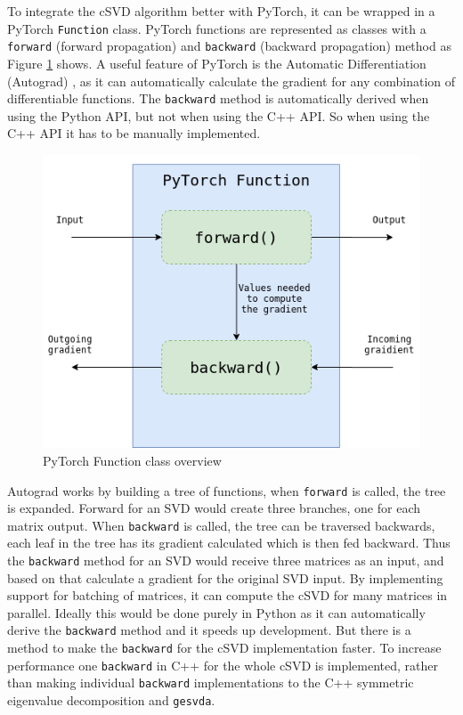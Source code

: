 To integrate the cSVD algorithm better with PyTorch, it can be wrapped in a PyTorch \texttt{Function} class. PyTorch functions are represented as classes with a \texttt{forward} (forward propagation) and \texttt{backward} (backward propagation) method as Figure \ref{fig:pytorch:function} shows. A useful feature of PyTorch is the Automatic Differentiation (Autograd) \cite{pytorch:docs}, as it can automatically calculate the gradient for any combination of differentiable functions. The \texttt{backward} method is automatically derived when using the Python API, but not when using the C++ API. So when using the C++ API it has to be manually implemented.

\begin{figure}[H]
    \centering
    \includegraphics[scale=0.5]{Figures/pytorch_function.png}
    \caption{PyTorch Function class overview}
    \label{fig:pytorch:function}
\end{figure}

Autograd works by building a tree of functions, when \texttt{forward} is called, the tree is expanded. Forward for an SVD would create three branches, one for each matrix output. When \texttt{backward} is called, the tree can be traversed backwards, each leaf in the tree has its gradient calculated which is then fed backward. Thus the \texttt{backward} method for an SVD would receive three matrices as an input, and based on that calculate a gradient for the original SVD input. By implementing support for batching of matrices, it can compute the cSVD for many matrices in parallel. Ideally this would be done purely in Python as it can automatically derive the \texttt{backward} method and it speeds up development. But there is a method to make the \texttt{backward} for the cSVD implementation faster. To increase performance one \texttt{backward} in C++ for the whole cSVD is implemented, rather than making individual \texttt{backward} implementations to the C++ symmetric eigenvalue decomposition and \texttt{gesvda}.